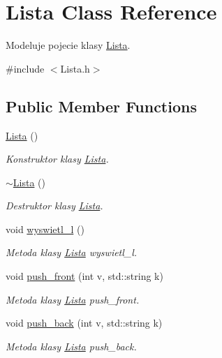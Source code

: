 \hypertarget{class_lista}{\section{Lista Class Reference}
\label{class_lista}
}


Modeluje pojecie klasy \hyperlink{class_lista}{Lista}.  




{\ttfamily \#include $<$Lista.\-h$>$}

\subsection*{Public Member Functions}
\begin{DoxyCompactItemize}
\item 
\hyperlink{class_lista_a1f668b36909182ef1360b48503529a31}{Lista} ()
\begin{DoxyCompactList}\small\item\em Konstruktor klasy \hyperlink{class_lista}{Lista}. \end{DoxyCompactList}\item 
\hyperlink{class_lista_a4d7394b2728a00ad8404965b2e15d096}{$\sim$\-Lista} ()
\begin{DoxyCompactList}\small\item\em Destruktor klasy \hyperlink{class_lista}{Lista}. \end{DoxyCompactList}\item 
void \hyperlink{class_lista_af9dfedaf314b64d618856767f1e868b3}{wyswietl\-\_\-l} ()
\begin{DoxyCompactList}\small\item\em Metoda klasy \hyperlink{class_lista}{Lista} wyswietl\-\_\-l. \end{DoxyCompactList}\item 
void \hyperlink{class_lista_af1af5dc62b5a373dff50964fbe7d30a3}{push\-\_\-front} (int v, std\-::string k)
\begin{DoxyCompactList}\small\item\em Metoda klasy \hyperlink{class_lista}{Lista} push\-\_\-front. \end{DoxyCompactList}\item 
void \hyperlink{class_lista_a634d0f970031a60b1a920277988e5e41}{push\-\_\-back} (int v, std\-::string k)
\begin{DoxyCompactList}\small\item\em Metoda klasy \hyperlink{class_lista}{Lista} push\-\_\-back. \end{DoxyCompactList}\item 

\end{DoxyCompactItemize}
